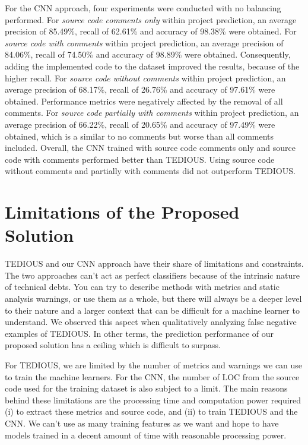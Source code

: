 For the CNN approach, four experiments were conducted with no balancing performed. For \textit{source code comments only} within project prediction, an average precision of 85.49\%, recall of 62.61\% and accuracy of 98.38\% were obtained. For \textit{source code with comments} within project prediction, an average precision of 84.06\%, recall of 74.50\% and accuracy of 98.89\% were obtained. Consequently, adding the implemented code to the dataset improved the results, because of the higher recall. For \textit{source code without comments} within project prediction, an average precision of 68.17\%, recall of 26.76\% and accuracy of 97.61\% were obtained. Performance metrics were negatively affected by the removal of all comments. For \textit{source code partially with comments} within project prediction, an average precision of 66.22\%, recall of 20.65\% and accuracy of 97.49\% were obtained, which is a similar to no comments but worse than all comments included. Overall, the CNN trained with source code comments only and source code with comments performed better than TEDIOUS. Using source code without comments and partially with comments did not outperform TEDIOUS.

\section{Limitations of the Proposed Solution}\label{sec:Limitations}


TEDIOUS and our CNN approach have their share of limitations and constraints. The two approaches can't act as perfect classifiers because of the intrinsic nature of technical debts. You can try to describe methods with metrics and static analysis warnings, or use them as a whole, but there will always be a deeper level to their nature and a larger context that can be difficult for a machine learner to understand. We observed this aspect when qualitatively analyzing false negative examples of TEDIOUS. In other terms, the prediction performance of our proposed solution has a ceiling which is difficult to surpass.

For TEDIOUS, we are limited by the number of metrics and warnings we can use to train the machine learners. For the CNN, the number of LOC from the source code used for the training dataset is also subject to a limit. The main reasons behind these limitations are the processing time and computation power required (i) to extract these metrics and source code, and (ii) to train TEDIOUS and the CNN. We can't use as many training features as we want and hope to have models trained in a decent amount of time with reasonable processing power.

